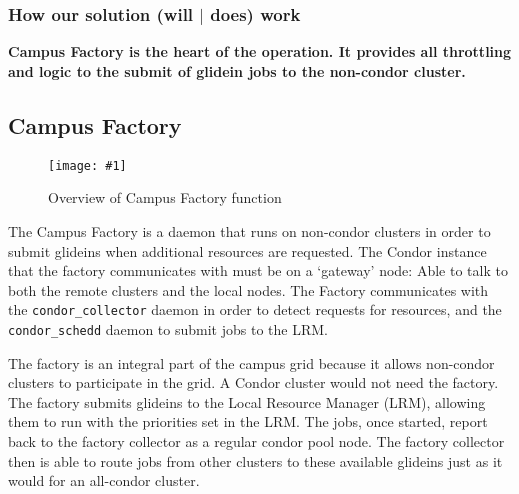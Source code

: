 \documentclass[11pt]{article}
\newlength{\imgwidth}
\newcommand\scalegraphics[1]{%
    \settowidth{\imgwidth}{\texttt{[image: \#1]}}%
    \setlength{\imgwidth}{\minof{\imgwidth}{\textwidth}}%
    \texttt{[image: \#1]}%
}
\begin{document}
\subsubsection*{How our solution (will $|$ does) work}




\textbf{ Campus Factory is the heart of the operation.  It provides all throttling and logic to the submit of glidein jobs to the non-condor cluster.}

\subsection{Campus Factory}
\begin{figure}[ht]
\centering
\scalegraphics{images/FactoryOverview.pdf}
\caption{Overview of Campus Factory function}
\label{fig:campusfactoryoverview}
\end{figure}
The Campus Factory is a daemon that runs on non-condor clusters in order to submit glideins when additional resources are requested.  The Condor instance that the factory communicates with must be on a `gateway' node: Able to talk to both the remote clusters and the local nodes.   The Factory communicates with the \texttt{condor\_collector} daemon in order to detect requests for resources, and the \texttt{condor\_schedd} daemon to submit jobs to the LRM.  

The factory is an integral part of the campus grid because it allows non-condor clusters to participate in the grid.  A Condor cluster would not need the factory.  The factory submits glideins to the Local Resource Manager (LRM), allowing them to run with the priorities set in the LRM.  The jobs, once started, report back to the factory collector as a regular condor pool node.  The factory collector then is able to route jobs from other clusters to these available glideins just as it would for an all-condor cluster.
\end{document}
